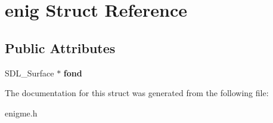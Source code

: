 \hypertarget{structenig}{}\section{enig Struct Reference}
\label{structenig}
\subsection*{Public Attributes}
\begin{DoxyCompactItemize}
\item 
\mbox{\label{structenig_a836a4581e30476de7bdda714f5b42ae9}} 
S\+D\+L\+\_\+\+Surface $\ast$ {\bfseries fond}
\end{DoxyCompactItemize}


The documentation for this struct was generated from the following file\+:\begin{DoxyCompactItemize}
\item 
enigme.\+h\end{DoxyCompactItemize}

